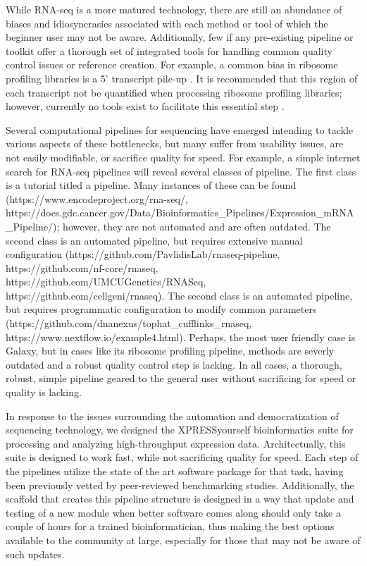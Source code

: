 \documentclass[11pt, a4paper, oneside]{article}
\begin{document}
While RNA-seq is a more matured technology, there are still an abundance of biases and idiosyncrasies associated with each method or tool of which the beginner user may not be aware. Additionally, few if any pre-existing pipeline or toolkit offer a thorough set of integrated tools for handling common quality control issues or reference creation. For example, a common bias in ribosome profiling libraries is a 5' transcript pile-up \cite{gerashchenko_nar, artieri_gr, hussman_plosg}. It is recommended that this region of each transcript not be quantified when processing ribosome profiling libraries; however, currently no tools exist to facilitate this essential step \cite{ingolia_meth, weinberg_reports}. \par

Several computational pipelines for sequencing have emerged intending to tackle various aspects of these bottlenecks, but many suffer from usability issues, are not easily modifiable, or sacrifice quality for speed. For example, a simple internet search for RNA-seq pipelines will reveal several classes of pipeline. The first class is a tutorial titled a pipeline. Many instances of these can be found (https://www.encodeproject.org/rna-seq/, https://docs.gdc.cancer.gov/Data/Bioinformatics\_Pipelines/Expression\_mRNA\_Pipeline/); however, they are not automated and are often outdated. The second class is an automated pipeline, but requires extensive manual configuration (https://github.com/PavlidisLab/rnaseq-pipeline, https://github.com/nf-core/rnaseq, https://github.com/UMCUGenetics/RNASeq, https://github.com/cellgeni/rnaseq). The second class is an automated pipeline, but requires programmatic configuration to modify common parameters (https://github.com/dnanexus/tophat\_cufflinks\_rnaseq, https://www.nextflow.io/example4.html). Perhaps, the most user friendly case is Galaxy, but in cases like its ribosome profiling pipeline, methods are severly outdated and a robust quality control step is lacking. In all cases, a thorough, robust, simple pipeline geared to the general user without sacrificing for speed or quality is lacking. \par

In response to the issues surrounding the automation and democratization of sequencing technology, we designed the XPRESSyourself bioinformatics suite for processing and analyzing high-throughput expression data. Architectually, this suite is designed to work fast, while not sacrificing quality for speed. Each step of the pipelines utilize the state of the art software package for that task, having been previously vetted by peer-reviewed benchmarking studies. Additionally, the scaffold that creates this pipeline structure is designed in a way that update and testing of a new module when better software comes along should only take a couple of hours for a trained bioinformatician, thus making the best options available to the community at large, especially for those that may not be aware of such updates. \par
\end{document}
